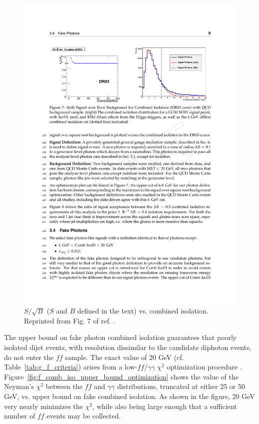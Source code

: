 \documentclass[dissertation.tex]{subfiles}
\begin{document}
\begin{figure}
	\centering
	\includegraphics[scale=1.0]{Icomb_optimization}
	\caption{$S/\sqrt{B}$ ($S$ and $B$ defined in the text) vs. combined isolation.  Reprinted from Fig. 7 of ref. \cite{CMS_AN-2011-515}.}
	\label{fig:Icomb_optimization}
\end{figure}

The upper bound on fake photon combined isolation guarantees that poorly isolated dijet events, with \MET resolution dissimilar to the candidate diphoton events, do not enter the $\mathit{ff}$ sample.  The exact value of 20 GeV (cf. Table~\ref{tab:g_f_criteria}) arises from a low-\MET $\mathit{ff}$/$\gamma\gamma$ $\chi^{2}$ optimization procedure \cite{CMS_AN-2011-515}.  Figure~\ref{fig:f_comb_iso_upper_bound_optimization} shows the value of the Neyman's $\chi^{2}$ between the $\mathit{ff}$ and $\gamma\gamma$ \MET distributions, truncated at either 25 or 50 GeV, vs. upper bound on fake combined isolation.  As shown in the figure, 20 GeV very nearly minimizes the $\chi^{2}$, while also being large enough that a sufficient number of $\mathit{ff}$ events may be collected.
\end{document}
